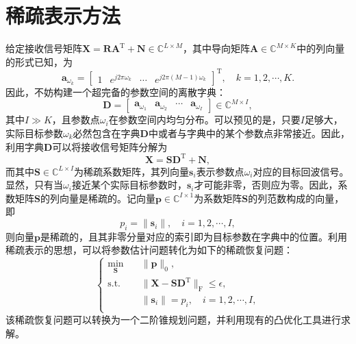 \section{稀疏表示方法}

给定接收信号矩阵\( \mathbf{X} = \mathbf{R} \mathbf{A}^{\mathrm{T}}  + \mathbf{N} \in \mathbb{C}^{L \times M} \)，其中导向矩阵\( \mathbf{A} \in \mathbb{C}^{M \times K} \)中的列向量的形式已知，为
\[
    \bm{a}_{\omega_k}
    = \begin{bmatrix}
        1 & e^{j2\pi\omega_k} & \cdots & e^{j2\pi(M-1)\omega_k}
    \end{bmatrix}^{\mathrm{T}}, \quad k=1,2,\cdots,K.
\]
因此，不妨构建一个超完备的参数空间的离散字典：
\[
    \mathbf{D} = \begin{bmatrix}
        \bm{a}_{\omega_1} & \bm{a}_{\omega_2} & \cdots & \bm{a}_{\omega_I}
    \end{bmatrix} \in \mathbb{C}^{M \times I},
\]
其中\( I \gg K \)，且参数点\( \omega_i \)在参数空间内均匀分布。可以预见的是，只要\( I \)足够大，实际目标参数\( \omega_k \)必然包含在字典\( \mathbf{D} \)中或者与字典中的某个参数点非常接近。因此，利用字典\( \mathbf{D} \)可以将接收信号矩阵分解为
\[
    \mathbf{X} = \mathbf{S} \mathbf{D}^{\mathrm{T}} + \mathbf{N},
\]
而其中\( \mathbf{S} \in \mathbb{C}^{L \times I} \)为稀疏系数矩阵，其列向量\( \bm{s}_i \)表示参数点\( \omega_i \)对应的目标回波信号。显然，只有当\( \omega_i \)接近某个实际目标参数时，\( \bm{s}_i \)才可能非零，否则应为零。因此，系数矩阵\( \mathbf{S} \)的列向量是稀疏的。记向量\( \bm{p} \in \mathbb{C}^{I \times 1}\)为系数矩阵\( \mathbf{S} \)的列范数构成的向量，即
\[
    p_i = \|\bm{s}_i\|, \quad i=1,2,\cdots,I,
\]
则向量\( \bm{p} \)是稀疏的，且其非零分量对应的索引即为目标参数在字典中的位置。利用稀疏表示的思想，可以将参数估计问题转化为如下的稀疏恢复问题：
\[
    \begin{cases}
        \min\limits_{\mathbf{S}} \quad & \|\bm{p}\|_0,                                                                   \\
        \text{s.t.} \quad              & \|\mathbf{X} - \mathbf{S} \mathbf{D}^{\mathrm{T}}\|_{\mathrm{F}} \leq \epsilon, \\
                                       & \| \bm{s}_i \| = p_i, \quad i=1,2,\cdots,I,                                     \\
    \end{cases}
\]
该稀疏恢复问题可以转换为一个二阶锥规划问题，并利用现有的凸优化工具进行求解。

